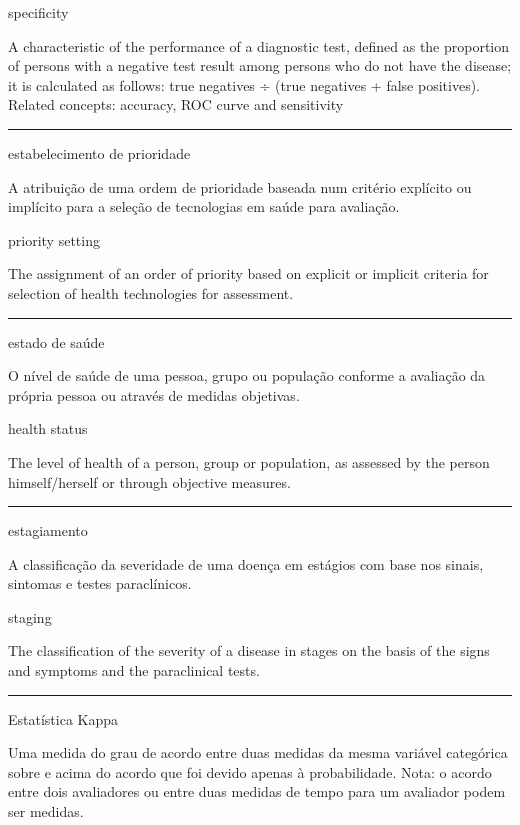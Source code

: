 \documentclass[
]{book}
\begin{document}
specificity

A characteristic of the performance of a diagnostic test, defined as the proportion of persons with a negative test result among persons who do not have the disease; it is calculated as follows: true negatives ÷ (true negatives + false positives). Related concepts: accuracy, ROC curve and sensitivity

\begin{center}\rule{0.5\linewidth}{0.5pt}\end{center}

estabelecimento de prioridade

A atribuição de uma ordem de prioridade baseada num critério explícito ou implícito para a seleção de tecnologias em saúde para avaliação.

priority setting

The assignment of an order of priority based on explicit or implicit criteria for selection of health technologies for assessment.

\begin{center}\rule{0.5\linewidth}{0.5pt}\end{center}

estado de saúde

O nível de saúde de uma pessoa, grupo ou população conforme a avaliação da própria pessoa ou através de medidas objetivas.

health status

The level of health of a person, group or population, as assessed by the person himself/herself or through objective measures.

\begin{center}\rule{0.5\linewidth}{0.5pt}\end{center}

estagiamento

A classificação da severidade de uma doença em estágios com base nos sinais, sintomas e testes paraclínicos.

staging

The classification of the severity of a disease in stages on the basis of the signs and symptoms and the paraclinical tests.

\begin{center}\rule{0.5\linewidth}{0.5pt}\end{center}

Estatística Kappa

Uma medida do grau de acordo entre duas medidas da mesma variável categórica sobre e acima do acordo que foi devido apenas à probabilidade. Nota: o acordo entre dois avaliadores ou entre duas medidas de tempo para um avaliador podem ser medidas.
\end{document}
